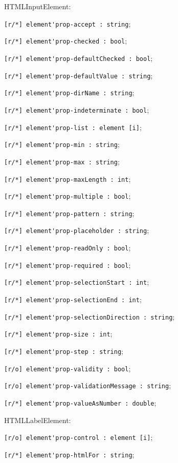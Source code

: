 \begin{icItems}
	\item HTMLInputElement:
	\begin{icItems}
		\item \lstinline|[r/*] element'prop-accept : string|;
		\item \lstinline|[r/*] element'prop-checked : bool|;
		\item \lstinline|[r/*] element'prop-defaultChecked : bool|;
		\item \lstinline|[r/*] element'prop-defaultValue : string|;
		\item \lstinline|[r/*] element'prop-dirName : string|;
		\item \lstinline|[r/*] element'prop-indeterminate : bool|;
		\item \lstinline|[r/*] element'prop-list : element [i]|;
		\item \lstinline|[r/*] element'prop-min : string|;
		\item \lstinline|[r/*] element'prop-max : string|;
		\item \lstinline|[r/*] element'prop-maxLength : int|;
		\item \lstinline|[r/*] element'prop-multiple : bool|;
		\item \lstinline|[r/*] element'prop-pattern : string|;
		\item \lstinline|[r/*] element'prop-placeholder : string|;
		\item \lstinline|[r/*] element'prop-readOnly : bool|;
		\item \lstinline|[r/*] element'prop-required : bool|;
		\item \lstinline|[r/*] element'prop-selectionStart : int|;
		\item \lstinline|[r/*] element'prop-selectionEnd : int|;
		\item \lstinline|[r/*] element'prop-selectionDirection : string|;
		\item \lstinline|[r/*] element'prop-size : int|;
		\item \lstinline|[r/*] element'prop-step : string|;
		\item \lstinline|[r/o] element'prop-validity : bool|;
		\item \lstinline|[r/o] element'prop-validationMessage : string|;
		\item \lstinline|[r/*] element'prop-valueAsNumber : double|;
	\end{icItems}
	
	\item HTMLLabelElement:
	\begin{icItems}
		\item \lstinline|[r/o] element'prop-control : element [i]|;
		\item \lstinline|[r/*] element'prop-htmlFor : string|;
	\end{icItems}
	

\end{icItems}
